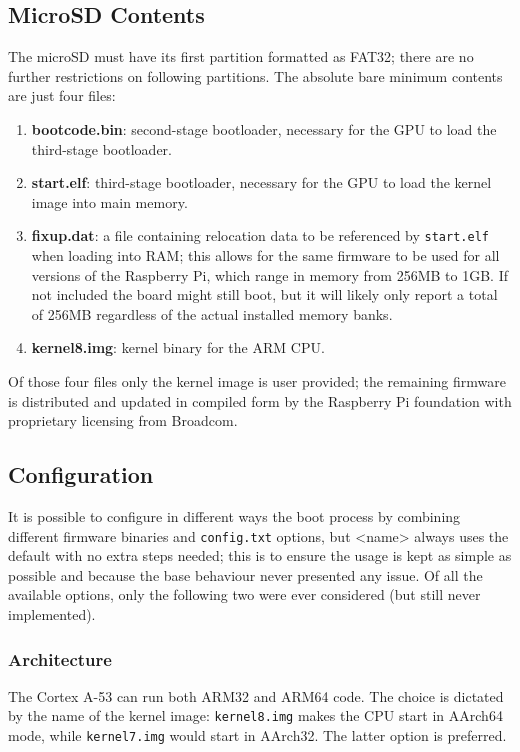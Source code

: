 \documentclass[12pt,a4paper,openright,twoside]{report}
\begin{document}
\subsection{MicroSD Contents}
The microSD must have its first partition formatted as FAT32; there are no 
further restrictions on following partitions. The absolute bare minimum contents 
are just four files:
\begin{enumerate}
    \item \textbf{bootcode.bin}: second-stage bootloader, necessary for the GPU
            to load the third-stage bootloader.
    \item \textbf{start.elf}: third-stage bootloader, necessary for the GPU to load
            the kernel image into main memory.
    \item \textbf{fixup.dat}: a file containing relocation data to be referenced 
            by {\tt start.elf} when loading into RAM; this allows for the same firmware 
            to be used for all versions of the Raspberry Pi, which range in 
            memory from 256MB to 1GB. If not included the board might still boot,
            but it will likely only report a total of 256MB regardless of the
            actual installed memory banks.
    \item \textbf{kernel8.img}: kernel binary for the ARM CPU.
\end{enumerate}
Of those four files only the kernel image is user provided; the remaining firmware
is distributed and updated in compiled form by the Raspberry Pi foundation with
proprietary licensing from Broadcom.

\subsection{Configuration}
It is possible to configure in different ways the boot process by combining
different firmware binaries and {\tt config.txt} options, but <name> always uses
the default with no extra steps needed; this is to ensure the usage is kept
as simple as possible and because the base behaviour never presented any issue.
Of all the available options, only the following two were ever considered 
(but still never implemented).

\subsubsection{Architecture}
The Cortex A-53 can run both ARM32 and ARM64 code. The choice is dictated by the
name of the kernel image: {\tt kernel8.img} makes the CPU start in AArch64 mode,
while {\tt kernel7.img} would start in AArch32. The latter option is preferred.
\end{document}
